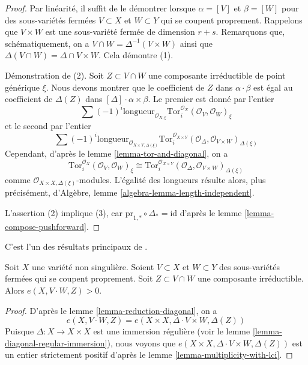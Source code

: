 \begin{proof}
Par linéarité, il suffit de le démontrer lorsque $\alpha = [V]$ et $\beta = [W]$
pour des sous-variétés fermées $V \subset X$ et $W \subset Y$ qui se coupent
proprement. Rappelons que $V \times W$ est une sous-variété fermée de dimension $r + s$.
Remarquons que, schématiquement, on a
$V \cap W = \Delta^{-1}(V \times W)$ ainsi que
$\Delta(V \cap W) = \Delta \cap V \times W$.
Cela démontre (1).

\medskip\noindent
Démonstration de (2). Soit $Z \subset V \cap W$ une composante irréductible
de point générique $\xi$. Nous devons montrer que le coefficient de
$Z$ dans $\alpha \cdot \beta$ est égal au coefficient de
$\Delta(Z)$ dans $[\Delta] \cdot \alpha \times \beta$. Le premier est donné
par l'entier
$$
\sum (-1)^i
\text{longueur}_{\mathcal{O}_{X, \xi}}
\text{Tor}_i^{\mathcal{O}_X}(\mathcal{O}_V, \mathcal{O}_W)_\xi
$$
et le second par l'entier
$$
\sum (-1)^i
\text{longueur}_{\mathcal{O}_{X \times Y, \Delta(\xi)}}
\text{Tor}_i^{\mathcal{O}_{X \times Y}}(
\mathcal{O}_\Delta, \mathcal{O}_{V \times W})_{\Delta(\xi)}
$$
Cependant, d'après le lemme \ref{lemma-tor-and-diagonal}, on a
$$
\text{Tor}_i^{\mathcal{O}_X}(\mathcal{O}_V, \mathcal{O}_W)_\xi \cong
\text{Tor}_i^{\mathcal{O}_{X \times Y}}(
\mathcal{O}_\Delta, \mathcal{O}_{V \times W})_{\Delta(\xi)}
$$
comme $\mathcal{O}_{X \times X, \Delta(\xi)}$-modules. L'égalité
des longueurs résulte alors, plus précisément, d'Algèbre,
lemme \ref{algebra-lemma-length-independent}.

\medskip\noindent
L'assertion (2) implique (3), car
$\text{pr}_{1, *} \circ \Delta_* = \text{id}$ d'après
le lemme \ref{lemma-compose-pushforward}.
\end{proof}

\begin{proposition}
\label{proposition-positivity}
\begin{reference}
C'est l'un des résultats principaux de \cite{Serre_algebre_locale}.
\end{reference}
Soit $X$ une variété non singulière. Soient $V \subset X$ et
$W \subset Y$ des sous-variétés fermées qui se coupent proprement.
Soit $Z \subset V \cap W$ une composante irréductible.
Alors $e(X, V \cdot W, Z) > 0$.
\end{proposition}

\begin{proof}
D'après le lemme \ref{lemma-reduction-diagonal}, on a
$$
e(X, V \cdot W, Z) = e(X \times X, \Delta \cdot V \times W, \Delta(Z))
$$
Puisque $\Delta : X \to X \times X$ est une immersion régulière
(voir le lemme \ref{lemma-diagonal-regular-immersion}), nous voyons que
$e(X \times X, \Delta \cdot V \times W, \Delta(Z))$ est un entier strictement
positif d'après le lemme \ref{lemma-multiplicity-with-lci}.
\end{proof}

